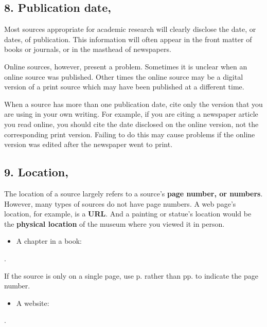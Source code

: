 \subsection{8. Publication date,}

Most sources appropriate for academic research will clearly disclose the date, or dates, of publication. This information will often appear in the front matter of books or journals, or in the masthead of newspapers. 

Online sources, however, present a problem. Sometimes it is unclear when an online source was published. Other times the online source may be a digital version of a print source which may have been published at a different time. 

When a source has more than one publication date, cite only the version that you are using in your own writing. For example, if you are citing a newspaper article you read online, you should cite the date disclosed on the online version, not the corresponding print version. Failing to do this may cause problems if the online version was edited after the newspaper went to print.

\subsection{9. Location,}

The location of a source largely refers to a source's \textbf{page number, or numbers}. However, many types of sources do not have page numbers. A web page's location, for example, is a \textbf{URL}. And a painting or statue's location would be the \textbf{physical location} of the museum where you viewed it in person. 

\begin{itemize}
\item A chapter in a book:
\end{itemize}

. \bigskip

\noindent If the source is only on a single page, use p. rather than pp. to indicate the page number.

\begin{itemize}
\item A website:
\end{itemize}

. \bigskip

